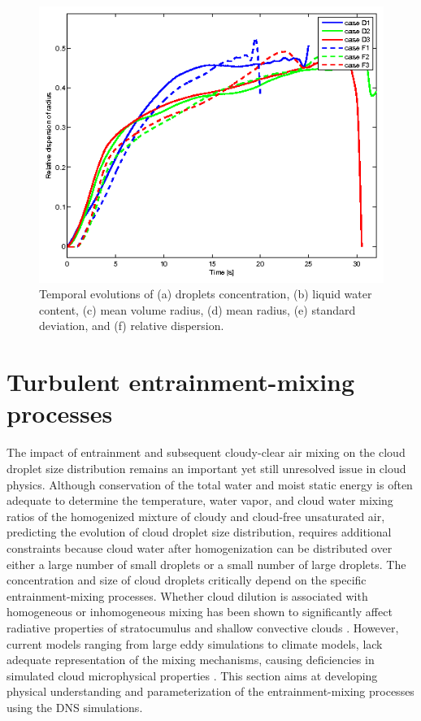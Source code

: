 \documentclass[draft,linenumbers]{agujournal}
\begin{document}
\begin{figure}[!htbp]
\includegraphics[width=0.48\linewidth]{Figures/dsp_radius}
\caption{Temporal evolutions of (a) droplets concentration, (b) liquid water content, (c) mean volume radius, (d) mean radius, (e) standard deviation, and (f) relative dispersion.}\label{fig:temporal_variation} 
\end{figure}

\section{Turbulent entrainment-mixing processes}\label{mixing_processes}

The impact of entrainment and subsequent cloudy-clear air mixing on the cloud droplet size distribution remains an important yet still unresolved issue in cloud physics. Although conservation of the total water and moist static energy is often adequate to determine the temperature, water vapor, and cloud water mixing ratios of the homogenized mixture of cloudy and cloud-free unsaturated air,  predicting the evolution of cloud droplet size distribution, requires additional constraints because cloud water after homogenization can be distributed over either a large number of small droplets or a small number of large droplets. The concentration and size of cloud droplets critically depend on the specific entrainment-mixing processes. Whether cloud dilution is associated with homogeneous or inhomogeneous mixing has been shown to significantly affect radiative properties of stratocumulus \citep{Chosson2007} and shallow convective clouds \citep{Grabowski2006, Slawinska2008}. However, current models ranging from large eddy simulations to climate models, lack adequate representation of the mixing mechanisms, causing deficiencies in simulated cloud microphysical properties \citep{Endo2015}. This section aims at developing physical understanding and parameterization of the entrainment-mixing processes using the DNS simulations. 
\end{document}
